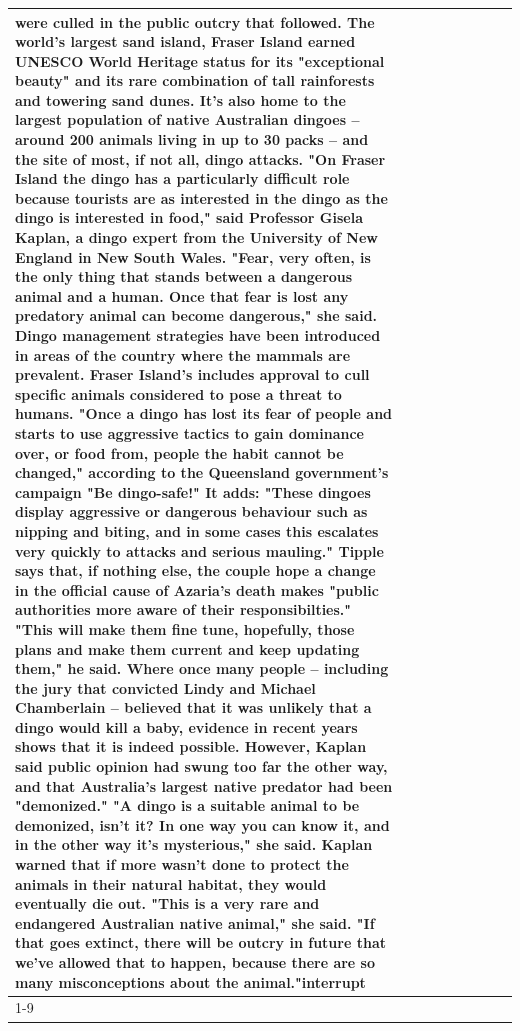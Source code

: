 \begin{table}[H]
\begin{tabular}{lllrlllll}
were culled in the public outcry that followed. The world's largest sand island, Fraser Island earned UNESCO World Heritage status for its "exceptional beauty" and its rare combination of tall rainforests and towering sand dunes. It's also home to the largest population of native Australian dingoes -- around 200 animals living in up to 30 packs -- and the site of most, if not all, dingo attacks. "On Fraser Island the dingo has a particularly difficult role because tourists are as interested in the dingo as the dingo is interested in food," said Professor Gisela Kaplan, a dingo expert from the University of New England in New South Wales. "Fear, very often, is the only thing that stands between a dangerous animal and a human. Once that fear is lost any predatory animal can become dangerous," she said. Dingo management strategies have been introduced in areas of the country where the mammals are prevalent. Fraser Island's includes approval to cull specific animals considered to pose a threat to humans. "Once a dingo has lost its fear of people and starts to use aggressive tactics to gain dominance over, or food from, people the habit cannot be changed," according to the Queensland government's campaign "Be dingo-safe!" It adds: "These dingoes display aggressive or dangerous behaviour such as nipping and biting, and in some cases this escalates very quickly to attacks and serious mauling." Tipple says that, if nothing else, the couple hope a change in the official cause of Azaria's death makes "public authorities more aware of their responsibilties." "This will make them fine tune, hopefully, those plans and make them current and keep updating them," he said. Where once many people -- including the jury that convicted Lindy and Michael Chamberlain -- believed that it was unlikely that a dingo would kill a baby, evidence in recent years shows that it is indeed possible. However, Kaplan said public opinion had swung too far the other way, and that Australia's largest native predator had been "demonized." "A dingo is a suitable animal to be demonized, isn't it? In one way you can know it, and in the other way it's mysterious," she said. Kaplan warned that if more wasn't done to protect the animals in their natural habitat, they would eventually die out. "This is a very rare and endangered Australian native animal," she said. "If that goes extinct, there will be outcry in future that we've allowed that to happen, because there are so many misconceptions about the animal."interrupt \\
\cline{1-9}

\end{tabular}
\end{table}

